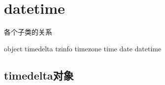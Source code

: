 \section{datetime}
各个子类的关系
\begin{python}
object 
    timedelta
    tzinfo
	timezone
    time
    date
	datetime
\end{python}
\subsection{timedelta对象}

